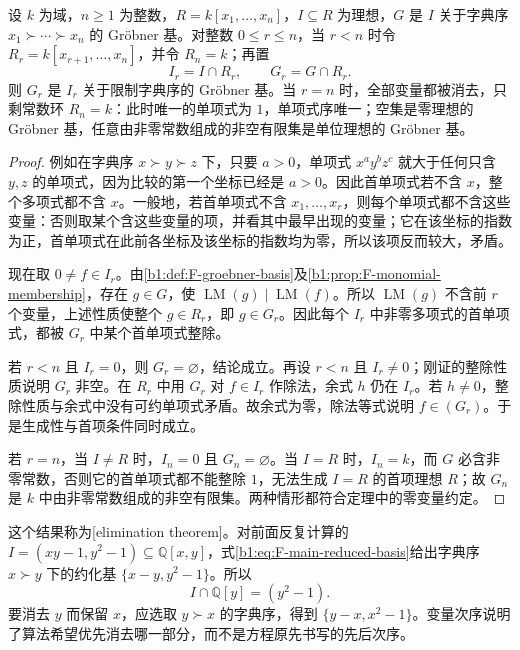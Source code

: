 \begin{theorem}[消去定理]\label{b1:thm:F-elimination}
	设 \(k\) 为域，\(n\geq1\) 为整数，\(R=k[x_1,\ldots,x_n]\)，\(I\subseteq R\) 为理想，\(G\) 是 \(I\) 关于字典序 \(x_1\succ\cdots\succ x_n\) 的 Gröbner 基。对整数 \(0\leq r\leq n\)，当 \(r<n\) 时令 \(R_r=k[x_{r+1},\ldots,x_n]\)，并令 \(R_n=k\)；再置
	\[
		I_r=I\cap R_r,\qquad G_r=G\cap R_r.
	\]
	则 \(G_r\) 是 \(I_r\) 关于限制字典序的 Gröbner 基。当 \(r=n\) 时，全部变量都被消去，只剩常数环 \(R_n=k\)：此时唯一的单项式为 \(1\)，单项式序唯一；空集是零理想的 Gröbner 基，任意由非零常数组成的非空有限集是单位理想的 Gröbner 基。
\end{theorem}
\begin{proof}
	例如在字典序 \(x\succ y\succ z\) 下，只要 \(a>0\)，单项式 \(x^ay^bz^c\) 就大于任何只含 \(y,z\) 的单项式，因为比较的第一个坐标已经是 \(a>0\)。因此首单项式若不含 \(x\)，整个多项式都不含 \(x\)。一般地，若首单项式不含 \(x_1,\ldots,x_r\)，则每个单项式都不含这些变量：否则取某个含这些变量的项，并看其中最早出现的变量；它在该坐标的指数为正，首单项式在此前各坐标及该坐标的指数均为零，所以该项反而较大，矛盾。

	现在取 \(0\ne f\in I_r\)。由\cref{b1:def:F-groebner-basis}及\cref{b1:prop:F-monomial-membership}，存在 \(g\in G\)，使 \(\operatorname{LM}(g)\mid\operatorname{LM}(f)\)。所以 \(\operatorname{LM}(g)\) 不含前 \(r\) 个变量，上述性质使整个 \(g\in R_r\)，即 \(g\in G_r\)。因此每个 \(I_r\) 中非零多项式的首单项式，都被 \(G_r\) 中某个首单项式整除。

	若 \(r<n\) 且 \(I_r=0\)，则 \(G_r=\varnothing\)，结论成立。再设 \(r<n\) 且 \(I_r\ne0\)；刚证的整除性质说明 \(G_r\) 非空。在 \(R_r\) 中用 \(G_r\) 对 \(f\in I_r\) 作除法，余式 \(h\) 仍在 \(I_r\)。若 \(h\ne0\)，整除性质与余式中没有可约单项式矛盾。故余式为零，除法等式说明 \(f\in(G_r)\)。于是生成性与首项条件同时成立。

	若 \(r=n\)，当 \(I\ne R\) 时，\(I_n=0\) 且 \(G_n=\varnothing\)。当 \(I=R\) 时，\(I_n=k\)，而 \(G\) 必含非零常数，否则它的首单项式都不能整除 \(1\)，无法生成 \(I=R\) 的首项理想 \(R\)；故 \(G_n\) 是 \(k\) 中由非零常数组成的非空有限集。两种情形都符合定理中的零变量约定。
\end{proof}

这个结果称为[elimination theorem]。对前面反复计算的 \(I=(xy-1,y^2-1)\subseteq\mathbb Q[x,y]\)，式\eqref{b1:eq:F-main-reduced-basis}给出字典序 \(x\succ y\) 下的约化基 \(\{x-y,y^2-1\}\)。所以
\begin{equation}\label{b1:eq:F-basic-elimination}
	I\cap\mathbb Q[y]=(y^2-1).
\end{equation}
要消去 \(y\) 而保留 \(x\)，应选取 \(y\succ x\) 的字典序，得到 \(\{y-x,x^2-1\}\)。变量次序说明了算法希望优先消去哪一部分，而不是方程原先书写的先后次序。


